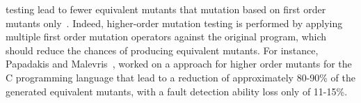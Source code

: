  testing lead to fewer equivalent mutants that mutation based on first order mutants only~\cite{jia2009higher,kintis2010evaluating,offutt1992investigations,papadakis2010empirical}. Indeed, higher-order mutation testing is performed by applying multiple first order mutation operators against the original program, 
which should reduce the chances of producing equivalent mutants. 
For instance, Papadakis and Malevris~\cite{papadakis2010empirical}, worked on a approach for higher order mutants for the C programming language that lead to a reduction of approximately 80-90\% of the generated equivalent mutants, with a fault detection ability loss only of 11-15\%. 

\endinput


